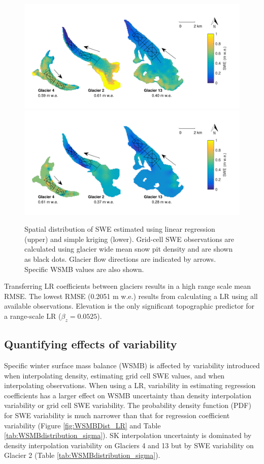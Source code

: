 \documentclass[twocolumn,letterpaper]{igs}
\begin{document}
\begin{figure}
	\centering
	\includegraphics[width =\textwidth]{LR_map.pdf}\\
    \includegraphics[width =\textwidth]{SK_map.pdf}\\
	\caption{Spatial distribution of SWE estimated using linear regression (upper) and simple kriging (lower). Grid-cell SWE observations are calculated using glacier wide mean snow pit density and are shown as black dots. Glacier flow directions are indicated by arrows. Specific WSMB values are also shown.}
	\label{fig:LR_SK_map}
\end{figure}

Transferring LR coefficients between glaciers results in a high range scale mean RMSE. The lowest RMSE (0.2051 m w.e.) results from calculating a LR using all available observations. Elevation is the only significant topographic predictor for a range-scale LR ($\beta_z=0.0525$).


\subsection{Quantifying effects of variability}

Specific winter surface mass balance (WSMB) is affected by variability introduced when interpolating density, estimating grid cell SWE values, and when interpolating observations. When using a LR, variability in estimating regression coefficients has a larger effect on WSMB uncertainty than density interpolation variability or grid cell SWE variability. The probability density function (PDF) for SWE variability is much narrower than that for regression coefficient variability (Figure \ref{fig:WSMBDist_LR} and Table \ref{tab:WSMBdistribution_sigma}). SK interpolation uncertainty is dominated by density interpolation variability on Glaciers 4 and 13 but by SWE variability on Glacier 2 (Table \ref{tab:WSMBdistribution_sigma}). 
\end{document}
